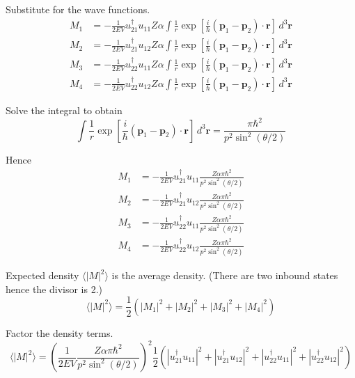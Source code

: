 Substitute for the wave functions.
\begin{align*}
M_1&=-\frac{1}{2EV}u_{21}^\dag u_{11}Z\alpha
\int\frac{1}{r}
\exp\left[\frac{i}{\hbar}(\mathbf p_1-\mathbf p_2)\cdot\mathbf r\right]\,d^3\mathbf r
\\[1ex]
M_2&=-\frac{1}{2EV}u_{21}^\dag u_{12}Z\alpha
\int\frac{1}{r}
\exp\left[\frac{i}{\hbar}(\mathbf p_1-\mathbf p_2)\cdot\mathbf r\right]\,d^3\mathbf r
\\[1ex]
M_3&=-\frac{1}{2EV}u_{22}^\dag u_{11}Z\alpha
\int\frac{1}{r}
\exp\left[\frac{i}{\hbar}(\mathbf p_1-\mathbf p_2)\cdot\mathbf r\right]\,d^3\mathbf r
\\[1ex]
M_4&=-\frac{1}{2EV}u_{22}^\dag u_{12}Z\alpha
\int\frac{1}{r}
\exp\left[\frac{i}{\hbar}(\mathbf p_1-\mathbf p_2)\cdot\mathbf r\right]\,d^3\mathbf r
\end{align*}

Solve the integral to obtain
\begin{equation*}
\int\frac{1}{r}
\exp\left[\frac{i}{\hbar}(\mathbf p_1-\mathbf p_2)\cdot\mathbf r\right]\,d^3\mathbf r
=\frac{\pi\hbar^2}{p^2\sin^2(\theta/2)}
\tag{1}
\end{equation*}

Hence
\begin{align*}
M_1&=-\frac{1}{2EV}u_{21}^\dag u_{11}
\frac{Z\alpha\pi\hbar^2}{p^2\sin^2(\theta/2)}
\\[1ex]
M_2&=-\frac{1}{2EV}u_{21}^\dag u_{12}
\frac{Z\alpha\pi\hbar^2}{p^2\sin^2(\theta/2)}
\\[1ex]
M_3&=-\frac{1}{2EV}u_{22}^\dag u_{11}
\frac{Z\alpha\pi\hbar^2}{p^2\sin^2(\theta/2)}
\\[1ex]
M_4&=-\frac{1}{2EV}u_{22}^\dag u_{12}
\frac{Z\alpha\pi\hbar^2}{p^2\sin^2(\theta/2)}
\end{align*}

Expected density $\langle|M|^2\rangle$ is the average density.
(There are two inbound states hence the divisor is 2.)
\begin{equation*}
\langle|M|^2\rangle=\frac{1}{2}\left(|M_1|^2+|M_2|^2+|M_3|^2+|M_4|^2\right)
\end{equation*}

Factor the density terms.
\begin{equation*}
\langle|M|^2\rangle
=\left(\frac{1}{2EV}
\frac{Z\alpha\pi\hbar^2}{p^2\sin^2(\theta/2)}\right)^2
\frac{1}{2}
\left(|u_{21}^\dag u_{11}|^2+|u_{21}^\dag u_{12}|^2+|u_{22}^\dag u_{11}|^2+|u_{22}^\dag u_{12}|^2\right)
\end{equation*}

